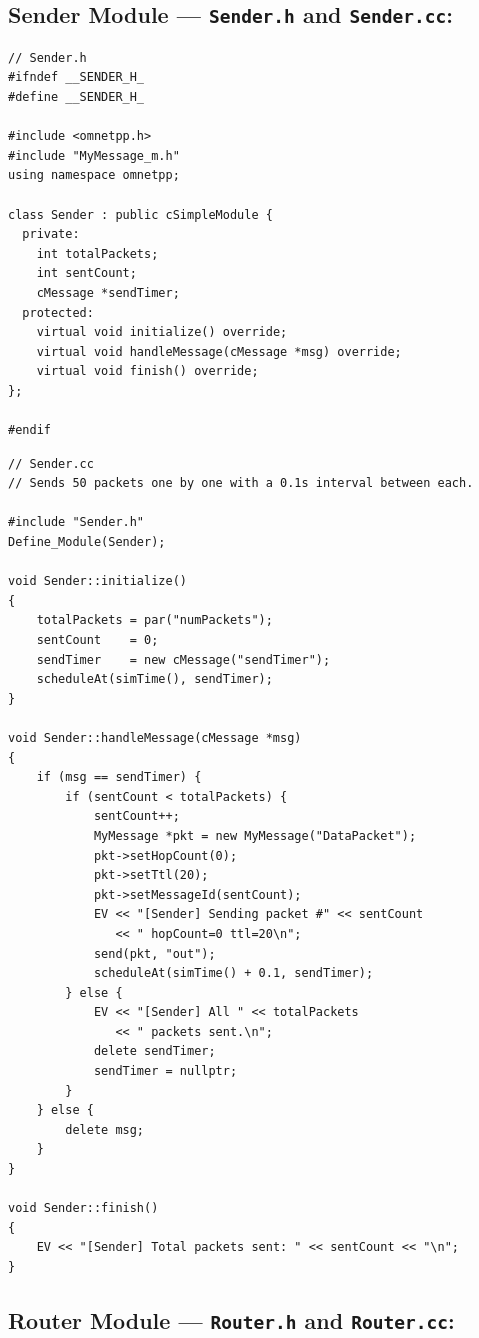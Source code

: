 \documentclass[12pt,a4paper]{article}
\begin{document}
\subsection{Sender Module --- \texttt{Sender.h} and \texttt{Sender.cc}: }

\begin{lstlisting}[style=cppstyle, caption={Sender.h -- Header file}]
// Sender.h
#ifndef __SENDER_H_
#define __SENDER_H_

#include <omnetpp.h>
#include "MyMessage_m.h"
using namespace omnetpp;

class Sender : public cSimpleModule {
  private:
    int totalPackets;
    int sentCount;
    cMessage *sendTimer;
  protected:
    virtual void initialize() override;
    virtual void handleMessage(cMessage *msg) override;
    virtual void finish() override;
};

#endif
\end{lstlisting}

\begin{lstlisting}[style=cppstyle, caption={Sender.cc -- Implementation}]
// Sender.cc
// Sends 50 packets one by one with a 0.1s interval between each.

#include "Sender.h"
Define_Module(Sender);

void Sender::initialize()
{
    totalPackets = par("numPackets");
    sentCount    = 0;
    sendTimer    = new cMessage("sendTimer");
    scheduleAt(simTime(), sendTimer);
}

void Sender::handleMessage(cMessage *msg)
{
    if (msg == sendTimer) {
        if (sentCount < totalPackets) {
            sentCount++;
            MyMessage *pkt = new MyMessage("DataPacket");
            pkt->setHopCount(0);
            pkt->setTtl(20);
            pkt->setMessageId(sentCount);
            EV << "[Sender] Sending packet #" << sentCount
               << " hopCount=0 ttl=20\n";
            send(pkt, "out");
            scheduleAt(simTime() + 0.1, sendTimer);
        } else {
            EV << "[Sender] All " << totalPackets
               << " packets sent.\n";
            delete sendTimer;
            sendTimer = nullptr;
        }
    } else {
        delete msg;
    }
}

void Sender::finish()
{
    EV << "[Sender] Total packets sent: " << sentCount << "\n";
}
\end{lstlisting}

\subsection{Router Module --- \texttt{Router.h} and \texttt{Router.cc}: }
\end{document}
